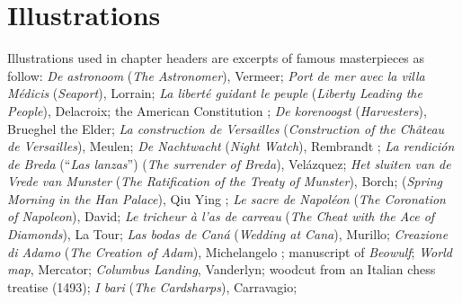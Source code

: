 \section*{Illustrations}
Illustrations used in
chapter headers are excerpts of famous masterpieces as follow:
\emph{De astronoom} (\emph{The Astronomer}), %
Vermeer;
\emph{Port de mer avec la villa Médicis} (\emph{Seaport}), %
Lorrain;
\emph{La liberté guidant le peuple} (\emph{Liberty Leading the People}),
Delacroix;
the American Constitution%
;
\emph{De korenoogst} (\emph{Harvesters}), %
Brueghel the Elder;
\emph{La construction de Versailles} (\emph{Construction of the Château de
  Versailles}), %
Meulen;
%
\emph{De Nachtwacht} (\emph{Night Watch}), Rembrandt%
;
\emph{La rendición de Breda} (``\emph{Las lanzas}'') (\emph{The surrender of
  Breda}), %
Velázquez;
\emph{Het sluiten van de Vrede van Munster} (\emph{The Ratification of the
  Treaty of Munster}), %
Borch;
(\emph{Spring Morning in the Han Palace}), Qiu Ying %
;
\emph{Le sacre de Napoléon} (\emph{The Coronation of Napoleon}),
David;
\emph{Le tricheur à l'as de carreau} (\emph{The Cheat with the Ace of
  Diamonds}), %
La Tour;
\emph{Las bodas de Caná} (\emph{Wedding at Cana}), %
Murillo;
\emph{Creazione di Adamo} (\emph{The Creation of Adam}), Michelangelo%
;
manuscript of \emph{Beowulf};
\emph{World map}, %
Mercator;
\emph{Columbus Landing}, %
Vanderlyn;
woodcut from an Italian chess treatise (1493);
\emph{I bari} (\emph{The Cardsharps}), %
Carravagio;




